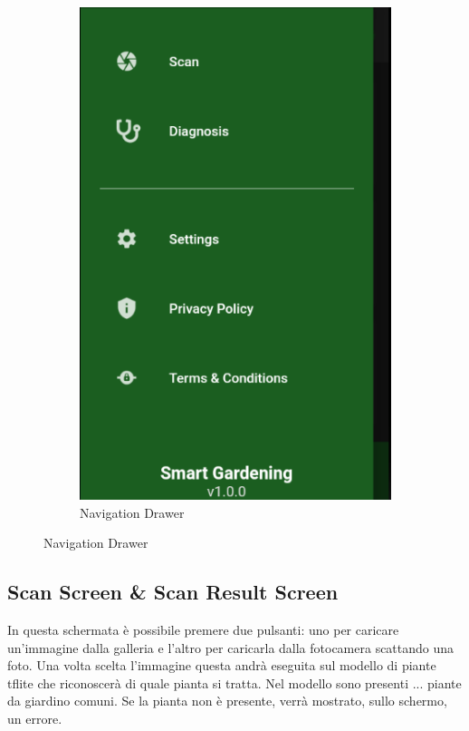 \documentclass[a4paper,12pt]{report}
\begin{document}
\begin{figure}[H]
\begin{subfigure}{0.3\textwidth}
		\includegraphics[width=\textwidth]{./images/navigation_drawer/navigation_drawer2.png}
		\caption{Navigation Drawer}
		\label{fig:navigation_drawer2}
	\end{subfigure}
\end{figure}

\subsection{Scan Screen \& Scan Result Screen}

\textsf{\small In questa schermata è possibile premere due pulsanti: uno per caricare un'immagine dalla galleria e l'altro per caricarla dalla fotocamera scattando una foto.}
\textsf{\small Una volta scelta l'immagine questa andrà eseguita sul modello di piante tflite che riconoscerà di quale pianta si tratta.}
\textsf{\small Nel modello sono presenti ... piante da giardino comuni.} %
\textsf{\small Se la pianta non è presente, verrà mostrato, sullo schermo, un errore.}
\end{document}
